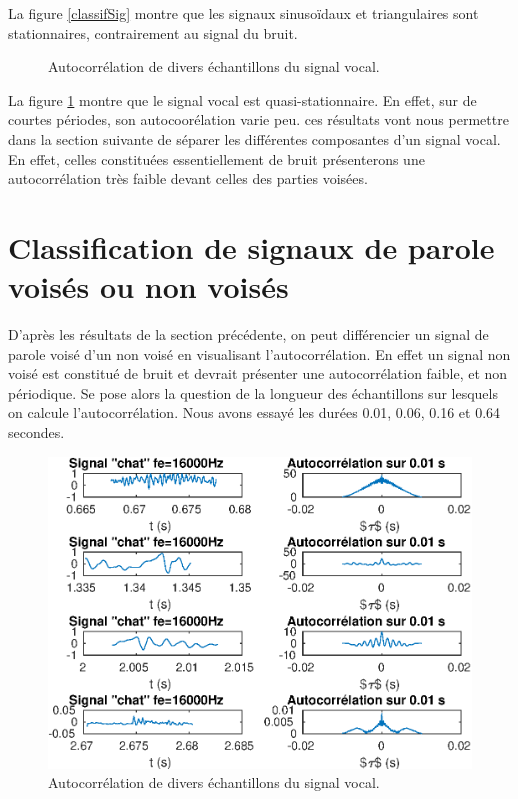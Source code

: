 \documentclass[french]{article}
\begin{document}
La figure \ref{classifSig} montre que les signaux sinusoïdaux et triangulaires sont stationnaires, contrairement au signal du bruit.

\begin{figure}[h!]
\centering

\caption{Autocorrélation de divers échantillons du signal vocal.}
\label{classifAh}
\end{figure}

La figure \ref{classifAh} montre que le signal vocal est quasi-stationnaire. En effet, sur de courtes périodes, son autocoorélation varie peu. ces résultats vont nous permettre dans la section suivante de séparer les différentes composantes d'un signal vocal. En effet, celles constituées essentiellement de bruit présenterons une autocorrélation très faible devant celles des parties voisées.

\FloatBarrier

\section{ Classification de signaux de parole voisés ou non voisés}

D'après les résultats de la section précédente, on peut différencier un signal de parole voisé d'un non voisé en visualisant l'autocorrélation. En effet un signal non voisé est constitué de bruit et devrait présenter une autocorrélation faible, et non périodique. Se pose alors la question de la longueur des échantillons sur lesquels on calcule l'autocorrélation. Nous avons essayé les durées 0.01, 0.06, 0.16 et 0.64 secondes.

\begin{figure}[h!]
\centering
\includegraphics[height=0.45\textheight]{images/classificationVoix1.eps}
\caption{Autocorrélation de divers échantillons du signal vocal.}
\label{classif1}
\end{figure}
\end{document}
